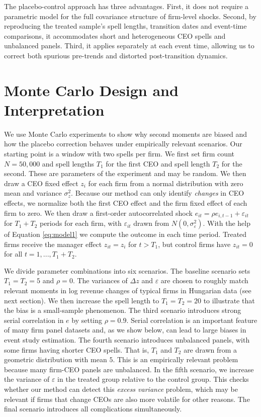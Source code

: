 \documentclass[11pt,a4paper]{article}
\begin{document}
The placebo-control approach has three advantages. First, it does not
require a parametric model for the full covariance structure of
firm-level shocks. Second, by reproducing the treated sample's spell
lengths, transition dates and event-time comparisons, it accommodates short and heterogeneous CEO spells and
unbalanced panels. Third, it applies separately at each event time,
allowing us to correct both spurious pre-trends and distorted
post-transition dynamics.


\section{Monte Carlo Design and Interpretation}\label{sec:MC}

We use Monte Carlo experiments to show why second moments are biased and how the placebo correction behaves under empirically relevant scenarios. Our starting point is a window with two spells per firm. We first set firm count $N=50,000$ and spell lengths $T_1$ for the first CEO and spell length $T_2$ for the second. These are parameters of the experiment and may be random. We then draw a CEO fixed effect $z_i$ for each firm from a normal distribution with zero mean and variance $\sigma_z^2$. Because our method can only identify \emph{changes} in CEO effects, we normalize both the first CEO effect and the firm fixed effect of each firm to zero. We then draw a first-order autocorrelated shock $e_{it} = \rho e_{i,t-1}+\varepsilon_{it}$ for $T_1+T_2$ periods for each firm, with $\varepsilon_{it}$ drawn from $N(0,\sigma^2_\varepsilon)$. With the help of Equation \eqref{eq:model1} we compute the outcome in each time period. Treated firms receive the manager effect $z_{it}=z_i$ for $t>T_1$, but control firms have $z_{it}=0$ for all $t=1,...,T_1+T_2$. 

We divide parameter combinations into six scenarios. The baseline scenario sets $T_1=T_2=5$ and $\rho=0$. The variances of $\Delta z$ and $\varepsilon$ are chosen to roughly match relevant moments in log revenue changes of typical firms in Hungarian data (see next section). We then increase the spell length to $T_1=T_2=20$ to illustrate that the bias is a small-sample phenomenon. The third scenario introduces strong serial correlation in $e$ by setting $\rho=0.9$. Serial correlation is an important feature of many firm panel datasets \citep{Olley1996-wy,Syverson2011-ti} and, as we show below, can lead to large biases in event study estimation. The fourth scenario introduces unbalanced panels, with some firms having shorter CEO spells. That is, $T_1$ and $T_2$ are drawn from a geometric distribution with mean $5$. This is an empirically relevant problem because many firm-CEO panels are unbalanced. In the fifth scenario, we increase the variance of $\varepsilon$ in the treated group relative to the control group. This checks whether our method can detect this \emph{excess variance} problem, which may be relevant if firms that change CEOs are also more volatile for other reasons. The final scenario introduces all complications simultaneously.
\end{document}
